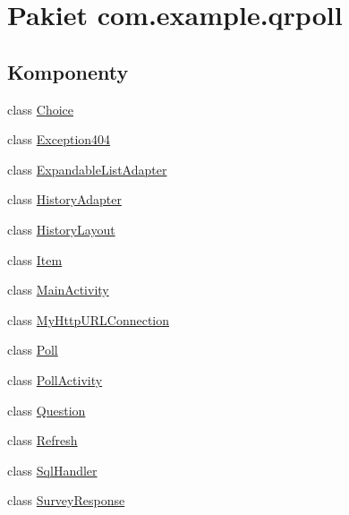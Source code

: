 \hypertarget{namespacecom_1_1example_1_1qrpoll}{\section{Pakiet com.\+example.\+qrpoll}
\label{namespacecom_1_1example_1_1qrpoll}
}
\subsection*{Komponenty}
\begin{DoxyCompactItemize}
\item 
class \hyperlink{classcom_1_1example_1_1qrpoll_1_1_choice}{Choice}
\item 
class \hyperlink{classcom_1_1example_1_1qrpoll_1_1_exception404}{Exception404}
\item 
class \hyperlink{classcom_1_1example_1_1qrpoll_1_1_expandable_list_adapter}{Expandable\+List\+Adapter}
\item 
class \hyperlink{classcom_1_1example_1_1qrpoll_1_1_history_adapter}{History\+Adapter}
\item 
class \hyperlink{classcom_1_1example_1_1qrpoll_1_1_history_layout}{History\+Layout}
\item 
class \hyperlink{classcom_1_1example_1_1qrpoll_1_1_item}{Item}
\item 
class \hyperlink{classcom_1_1example_1_1qrpoll_1_1_main_activity}{Main\+Activity}
\item 
class \hyperlink{classcom_1_1example_1_1qrpoll_1_1_my_http_u_r_l_connection}{My\+Http\+U\+R\+L\+Connection}
\item 
class \hyperlink{classcom_1_1example_1_1qrpoll_1_1_poll}{Poll}
\item 
class \hyperlink{classcom_1_1example_1_1qrpoll_1_1_poll_activity}{Poll\+Activity}
\item 
class \hyperlink{classcom_1_1example_1_1qrpoll_1_1_question}{Question}
\item 
class \hyperlink{classcom_1_1example_1_1qrpoll_1_1_refresh}{Refresh}
\item 
class \hyperlink{classcom_1_1example_1_1qrpoll_1_1_sql_handler}{Sql\+Handler}
\item 
class \hyperlink{classcom_1_1example_1_1qrpoll_1_1_survey_response}{Survey\+Response}
\end{DoxyCompactItemize}
